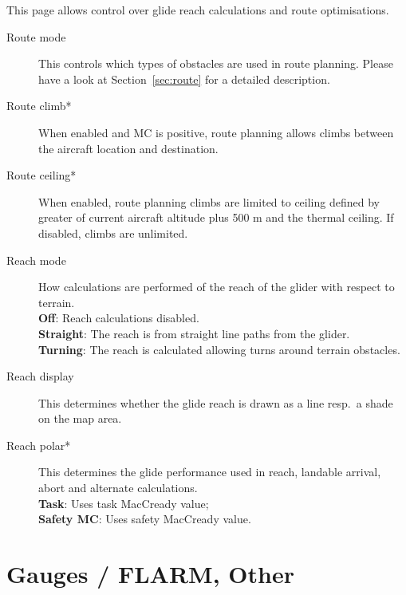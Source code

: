 This page allows control over glide reach calculations and route
optimisations.

\begin{description}
\item[Route mode]  \label{conf:routemode} This controls which types
  of obstacles are used in route planning. Please have a look at Section~\ref{sec:route} 
  for a detailed description.
\item[Route climb*]  \label{conf:routeclimb} When enabled and MC is positive, route 
  planning allows climbs between the aircraft location and destination.
\item[Route ceiling*]  \label{conf:routeceiling} When enabled, route planning climbs 
  are limited to ceiling defined by greater of current aircraft altitude plus 
  500 m and the thermal ceiling.  If disabled, climbs are unlimited.
\\
\item[Reach mode]  \label{conf:turningreach} How calculations are performed of 
  the reach of the glider with respect to terrain. \\
  {\bf Off}: Reach calculations disabled. \\
  {\bf Straight}: The reach is from straight line paths from the glider. \\
  {\bf Turning}: The reach is calculated allowing turns around terrain obstacles.
\item[Reach display]  \label{conf:gliderange} This determines whether the
glide reach is drawn as a line resp.\ a shade on the map area.
\item[Reach polar*]  \label{conf:reachpolar} This determines the glide performance 
  used in reach, landable arrival, abort and alternate calculations. \\
  {\bf Task}: Uses task MacCready value; \\
  {\bf Safety MC}: Uses safety MacCready value.
\end{description}


\section{Gauges / FLARM, Other} \label{sec:flarmandother-gauge}

